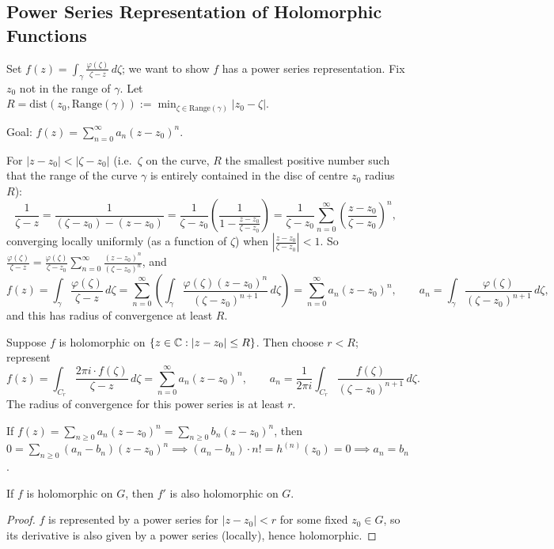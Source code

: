 \documentclass[11pt]{article}
\begin{document}
\subsection{Power Series Representation of Holomorphic Functions}

Set $f(z) = \int_\gamma \frac{\varphi(\zeta)}{\zeta-z}\,d\zeta$; we want to show $f$ has a power series representation. Fix $z_0$ not in the range of $\gamma$. Let $R = \mathrm{dist}(z_0,\mathrm{Range}(\gamma)) := \min_{\zeta\in\mathrm{Range}(\gamma)} |z_0-\zeta|$.

Goal: $f(z) = \sum_{n=0}^\infty a_n(z-z_0)^n$.

For $|z-z_0| < |\zeta-z_0|$ (i.e.\ $\zeta$ on the curve, $R$ the smallest positive number such that the range of the curve $\gamma$ is entirely contained in the disc of centre $z_0$ radius $R$):
\[
\frac{1}{\zeta-z} = \frac{1}{(\zeta-z_0)-(z-z_0)} = \frac{1}{\zeta-z_0}\left(\frac{1}{1-\frac{z-z_0}{\zeta-z_0}}\right) = \frac{1}{\zeta-z_0}\sum_{n=0}^\infty \left(\frac{z-z_0}{\zeta-z_0}\right)^n,
\]
converging locally uniformly (as a function of $\zeta$) when $\left|\frac{z-z_0}{\zeta-z_0}\right|<1$. So $\frac{\varphi(\zeta)}{\zeta-z} = \frac{\varphi(\zeta)}{\zeta-z_0}\sum_{n=0}^\infty \frac{(z-z_0)^n}{(\zeta-z_0)^n}$, and
\[
f(z) = \int_\gamma \frac{\varphi(\zeta)}{\zeta-z}\,d\zeta = \sum_{n=0}^\infty \left(\int_\gamma \frac{\varphi(\zeta)(z-z_0)^n}{(\zeta-z_0)^{n+1}}\,d\zeta\right) = \sum_{n=0}^\infty a_n(z-z_0)^n, \qquad a_n = \int_\gamma \frac{\varphi(\zeta)}{(\zeta-z_0)^{n+1}}\,d\zeta,
\]
and this has radius of convergence at least $R$.

\begin{theorem}
Suppose $f$ is holomorphic on $\{z \in {\mathbb{C}} : |z-z_0| \le R\}$. Then choose $r<R$; represent
\[
f(z) = \int_{C_r} \frac{2\pi i\cdot f(\zeta)}{\zeta-z}\,d\zeta = \sum_{n=0}^\infty a_n(z-z_0)^n, \qquad a_n = \frac{1}{2\pi i}\int_{C_r} \frac{f(\zeta)}{(\zeta-z_0)^{n+1}}\,d\zeta.
\]
The radius of convergence for this power series is at least $r$.
\end{theorem}

\begin{remark}
If $f(z) = \sum_{n\ge0} a_n(z-z_0)^n = \sum_{n\ge0} b_n(z-z_0)^n$, then $0 = \sum_{n\ge0}(a_n-b_n)(z-z_0)^n \implies (a_n-b_n)\cdot n! = h^{(n)}(z_0) = 0 \implies a_n=b_n$.
\end{remark}

\begin{corollary}
If $f$ is holomorphic on $G$, then $f'$ is also holomorphic on $G$.
\end{corollary}
\begin{proof}
$f$ is represented by a power series for $|z-z_0|<r$ for some fixed $z_0\in G$, so its derivative is also given by a power series (locally), hence holomorphic.
\end{proof}
\end{document}
